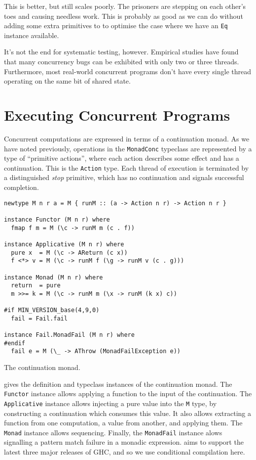 This is better, but still scales poorly.  The prisoners are stepping
on each other's toes and causing needless work.  This is probably as
good as we can do without adding some extra primitives to \dejafu{} to
optimise the case where we have an \verb|Eq| instance available.

It's not the end for systematic testing, however.  Empirical
studies\cite{thomson2014} have found that many concurrency bugs can be
exhibited with only two or three threads.  Furthermore, most
real-world concurrent programs don't have every single thread
operating on the same bit of shared state.

\section{Executing Concurrent Programs}
\label{sec:dejafu-execution}

Concurrent computations are expressed in terms of a continuation monad.  As we
have noted previously, operations in the \verb|MonadConc| typeclass are
represented by a type of ``primitive actions'', where each action describes some
effect and has a continuation.  This is the \verb|Action| type.  Each thread of
execution is terminated by a distinguished \emph{stop} primitive, which has no
continuation and signals successful completion.

\begin{listing}
  \begin{verbatim}
newtype M n r a = M { runM :: (a -> Action n r) -> Action n r }

instance Functor (M n r) where
  fmap f m = M (\c -> runM m (c . f))

instance Applicative (M n r) where
  pure x  = M (\c -> AReturn (c x))
  f <*> v = M (\c -> runM f (\g -> runM v (c . g)))

instance Monad (M n r) where
  return  = pure
  m >>= k = M (\c -> runM m (\x -> runM (k x) c))

#if MIN_VERSION_base(4,9,0)
  fail = Fail.fail

instance Fail.MonadFail (M n r) where
#endif
  fail e = M (\_ -> AThrow (MonadFailException e))
  \end{verbatim}
  \caption{The \dejafu{} continuation monad.}\label{lst:m}
\end{listing}

 gives the definition and typeclass instances of the \dejafu{}
continuation monad.  The \verb|Functor| instance allows applying a function to
the input of the continuation.  The \verb|Applicative| instance allows injecting
a pure value into the \verb|M| type, by constructing a continuation which
consumes this value.  It also allows extracting a function from one computation,
a value from another, and applying them.  The \verb|Monad| instance allows
sequencing.  Finally, the \verb|MonadFail| instance alows signalling a pattern
match failure in a monadic expression.  \dejafu{} aims to support the latest
three major releases of GHC, and so we use conditional compilation here.

